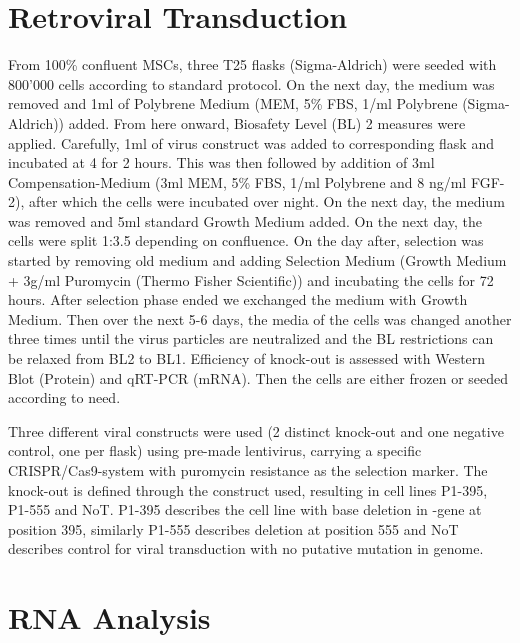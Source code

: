 \section{Retroviral Transduction}
\label{sec:RetroVir}
From 100\% confluent MSCs, three T25 flasks (Sigma-Aldrich) were seeded with 800'000 cells according to standard protocol. On the next day, the medium was removed and 1ml of Polybrene Medium (MEM\textalpha{}, 5\% FBS, 1\mul{}/ml Polybrene (Sigma-Aldrich)) added. From here onward, Biosafety Level (BL) 2 measures were applied. Carefully, 1ml of virus construct was added to corresponding flask and incubated at 4 \degC for 2 hours. This was then followed by addition of 3ml Compensation-Medium (3ml MEM\textalpha{}, 5\% FBS, 1\mul{}/ml Polybrene and 8 ng/ml FGF-2), after which the cells were incubated over night. On the next day, the medium was removed and 5ml standard Growth Medium added. On the next day, the cells were split 1:3.5 depending on confluence. On the day after, selection was started by removing old medium and adding Selection Medium (Growth Medium + 3\textmu{}g/ml Puromycin (Thermo Fisher Scientific)) and incubating the cells for 72 hours. After selection phase ended we exchanged the medium with Growth Medium. Then over the next 5-6 days, the media of the cells was changed another three times until the virus particles are neutralized and the BL restrictions can be relaxed from BL2 to BL1. Efficiency of knock-out is  assessed with Western Blot (Protein) and qRT-PCR (mRNA). Then the cells are either frozen or seeded according to need. 

Three different viral constructs were used (2 distinct \Piezo{} knock-out and one negative control, one per flask) using pre-made lentivirus, carrying a specific CRISPR/Cas9-system with puromycin resistance as the selection marker. The knock-out is defined through the construct used, resulting in cell lines P1-395, P1-555 and NoT. P1-395 describes the cell line with base deletion in \PiezoGene{}-gene at position 395, similarly P1-555 describes deletion at position 555 and NoT describes control for viral transduction with no putative mutation in genome.


\section{RNA Analysis}
